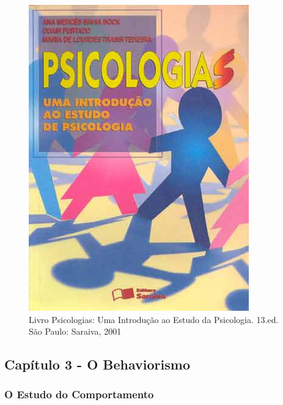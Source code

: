 \documentclass[
]{book}
\begin{document}
\begin{figure}

{\centering \includegraphics[width=0.5\linewidth]{imagens/capa-livro-psicologias} 

}

\caption{Livro Psicologias: Uma Introdução ao Estudo da Psicologia. 13.ed. São Paulo: Saraiva, 2001}\label{fig:unnamed-chunk-2}
\end{figure}

\hypertarget{capuxedtulo-3---o-behaviorismo}{%
\subsection{Capítulo 3 - O
Behaviorismo}\label{capuxedtulo-3---o-behaviorismo}}

\hypertarget{o-estudo-do-comportamento}{%
\subsubsection{O Estudo do
Comportamento}\label{o-estudo-do-comportamento}}
\end{document}
